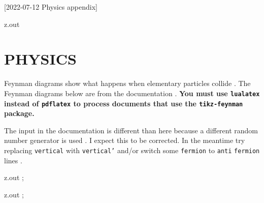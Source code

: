 [2022-07-12 Physics appendix]

\begin{VerbatimOut}{z.out}
\chapter{PHYSICS}

Feynman diagrams
show what happens
when elementary particles collide
\cite{wikipedia-feynman-diagram}.
The Feynman diagrams below are from the
 documentation \cite{ellis2016}.
\textbf{%
  You must use \texttt{lualatex} instead
  of \texttt{pdflatex}
  to process documents that use the \texttt{tikz-feynman} package.%
}

The input
in the documentation
is different than here because a different random number generator
is used \cite{menke2019}.
I expect this to be corrected.
In the meantime try replacing \texttt{vertical}
with \texttt{vertical'}
and/or switch some \texttt{fermion}
to \texttt{anti} \texttt{fermion} lines \cite{ellis2017}.
\end{VerbatimOut}

\MyIO


\begin{VerbatimOut}{z.out}
;
\end{VerbatimOut}

\MyIO


\begin{VerbatimOut}{z.out}
;
\end{VerbatimOut}

\MyIO
